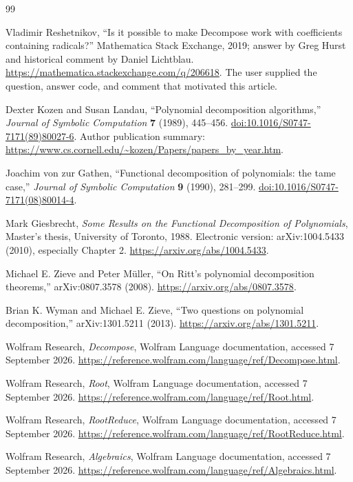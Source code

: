 \documentclass[11pt,a4paper]{article}
\theoremstyle{definition}
\begin{document}
\clearpage
\begin{thebibliography}{99}
Vladimir Reshetnikov, ``Is it possible to make Decompose work with coefficients containing radicals?'' Mathematica Stack Exchange, 2019; answer by Greg Hurst and historical comment by Daniel Lichtblau.
\url{https://mathematica.stackexchange.com/q/206618}.
The user supplied the question, answer code, and comment that motivated this article.

Dexter Kozen and Susan Landau, ``Polynomial decomposition algorithms,'' \emph{Journal of Symbolic Computation} \textbf{7} (1989), 445--456.
\href{https://doi.org/10.1016/S0747-7171(89)80027-6}{doi:10.1016/S0747-7171(89)80027-6}.
Author publication summary: \url{https://www.cs.cornell.edu/~kozen/Papers/papers_by_year.htm}.

Joachim von zur Gathen, ``Functional decomposition of polynomials: the tame case,'' \emph{Journal of Symbolic Computation} \textbf{9} (1990), 281--299.
\href{https://doi.org/10.1016/S0747-7171(08)80014-4}{doi:10.1016/S0747-7171(08)80014-4}.

Mark Giesbrecht, \emph{Some Results on the Functional Decomposition of Polynomials}, Master's thesis, University of Toronto, 1988. Electronic version: arXiv:1004.5433 (2010), especially Chapter 2.
\url{https://arxiv.org/abs/1004.5433}.

Michael E. Zieve and Peter M\"uller, ``On Ritt's polynomial decomposition theorems,'' arXiv:0807.3578 (2008).
\url{https://arxiv.org/abs/0807.3578}.

Brian K. Wyman and Michael E. Zieve, ``Two questions on polynomial decomposition,'' arXiv:1301.5211 (2013).
\url{https://arxiv.org/abs/1301.5211}.

Wolfram Research, \emph{Decompose}, Wolfram Language documentation, accessed 7 September 2026.
\url{https://reference.wolfram.com/language/ref/Decompose.html}.

Wolfram Research, \emph{Root}, Wolfram Language documentation, accessed 7 September 2026.
\url{https://reference.wolfram.com/language/ref/Root.html}.

Wolfram Research, \emph{RootReduce}, Wolfram Language documentation, accessed 7 September 2026.
\url{https://reference.wolfram.com/language/ref/RootReduce.html}.

Wolfram Research, \emph{Algebraics}, Wolfram Language documentation, accessed 7 September 2026.
\url{https://reference.wolfram.com/language/ref/Algebraics.html}.


\end{thebibliography}
\end{document}
